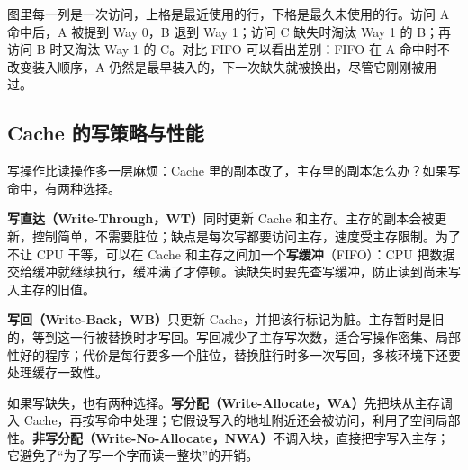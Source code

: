 图里每一列是一次访问，上格是最近使用的行，下格是最久未使用的行。访问 A 命中后，A 被提到 Way 0，B 退到 Way 1；访问 C 缺失时淘汰 Way 1 的 B；再访问 B 时又淘汰 Way 1 的 C。对比 FIFO 可以看出差别：FIFO 在 A 命中时不改变装入顺序，A 仍然是最早装入的，下一次缺失就被换出，尽管它刚刚被用过。

\subsection{Cache 的写策略与性能}

写操作比读操作多一层麻烦：Cache 里的副本改了，主存里的副本怎么办？如果写命中，有两种选择。

\textbf{写直达（Write-Through，WT）}同时更新 Cache 和主存。主存的副本会被更新，控制简单，不需要脏位；缺点是每次写都要访问主存，速度受主存限制。为了不让 CPU 干等，可以在 Cache 和主存之间加一个\textbf{写缓冲}（FIFO）：CPU 把数据交给缓冲就继续执行，缓冲满了才停顿。读缺失时要先查写缓冲，防止读到尚未写入主存的旧值。

\textbf{写回（Write-Back，WB）}只更新 Cache，并把该行标记为脏。主存暂时是旧的，等到这一行被替换时才写回。写回减少了主存写次数，适合写操作密集、局部性好的程序；代价是每行要多一个脏位，替换脏行时多一次写回，多核环境下还要处理缓存一致性。

如果写缺失，也有两种选择。\textbf{写分配（Write-Allocate，WA）}先把块从主存调入 Cache，再按写命中处理；它假设写入的地址附近还会被访问，利用了空间局部性。\textbf{非写分配（Write-No-Allocate，NWA）}不调入块，直接把字写入主存；它避免了“为了写一个字而读一整块”的开销。

